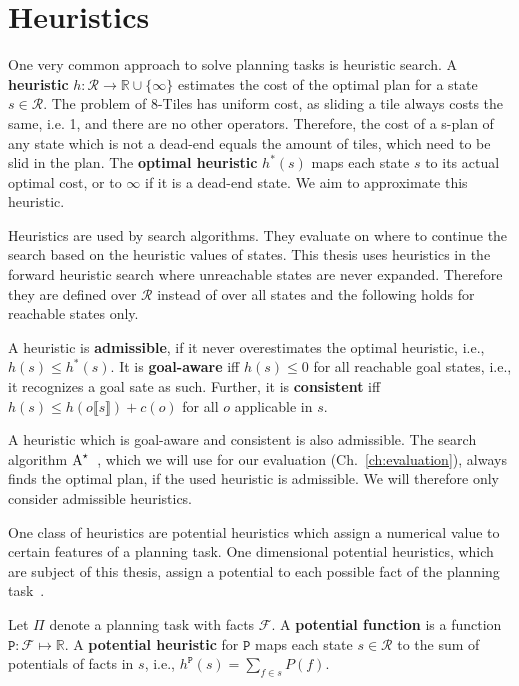 \section{Heuristics}\label{sec:heuristics}
One very common approach to solve planning tasks is heuristic search.
A \textbf{heuristic} $h:\mathcal{R} \rightarrow \mathbb{R} \cup \{\infty\} $ estimates the cost of the optimal plan for a state $s\in\mathcal{R}$.
The problem of 8-Tiles has uniform cost, as sliding a tile always costs the same, i.e. 1, and there are no other operators.
Therefore, the cost of a s-plan of any state which is not a dead-end equals the amount of tiles, which need to be slid in the plan.
The \textbf{optimal heuristic} $h^*(s)$ maps each state $s$ to its actual optimal cost, or to $\infty$ if it is a dead-end state.
We aim to approximate this heuristic.

Heuristics are used by search algorithms.
They evaluate on where to continue the search based on the heuristic values of states.
This thesis uses heuristics in the forward heuristic search where unreachable states are never expanded.
Therefore they are defined over $\mathcal{R}$ instead of over all states and the following holds for reachable states only.

A heuristic is \textbf{admissible}, if it never overestimates the optimal heuristic, i.e., $h(s)\leq h^*(s)$.
It is \textbf{goal-aware} iff $h(s)\leq 0$ for all reachable goal states, i.e., it recognizes a goal sate as such.
Further, it is \textbf{consistent} iff $h(s)\leq h(o\llbracket s\rrbracket)+c(o)$ for all $o$ applicable in $s$.

A heuristic which is goal-aware and consistent is also admissible.
The search algorithm $\textup{A}^{\star}$~\citep{hart1968formal}, which we will use for our evaluation (Ch.~\ref{ch:evaluation}), always finds the optimal plan, if the used heuristic is admissible.
We will therefore only consider admissible heuristics.

One class of heuristics are potential heuristics which assign a numerical value to certain features of a planning task.
One dimensional potential heuristics, which are subject of this thesis, assign a potential to each possible fact of the planning task~\citep{pommerening2015non}.
\begin{definition}
    Let $\Pi$ denote a planning task with facts $\mathcal{F}$.
    A \textbf{potential function} is a function $\mathtt{P}:\mathcal{F}\mapsto\mathbb{R}$.
    A \textbf{potential heuristic} for $\mathtt{P}$ maps each state $s\in\mathcal{R}$ to the sum of potentials of facts in $s$, i.e., $h^\mathtt{P}(s)=\sum_{f\in s}P(f)$.
\end{definition}

